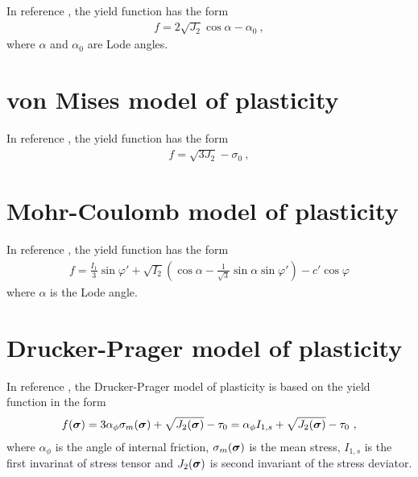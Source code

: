 In reference \cite{prochazka}, the yield function has the form
\begin{eqnarray}
f = 2\sqrt{J_2} \cos \alpha - \alpha_0\ ,
\end{eqnarray}
where $\alpha$ and $\alpha_0$ are Lode angles.

\section{von Mises model of plasticity}

In reference \cite{prochazka}, the yield function has the form
\begin{eqnarray}
f = \sqrt{3 J_2} - \sigma_0\ ,
\end{eqnarray}

\section{Mohr-Coulomb model of plasticity}

In reference \cite{prochazka}, the yield function has the form
\begin{eqnarray}
f = \frac{I_1}{3} \sin \varphi' + \sqrt{I_2}(\cos \alpha - \frac{1}{\sqrt{3}}\sin \alpha \sin \varphi') - c' \cos \varphi 
\end{eqnarray}
where $\alpha$ is the Lode angle.


\section{Drucker-Prager model of plasticity}

In reference \cite{jirasek:skripta}, the Drucker-Prager model of plasticity
is based on the yield function in the form
\begin{eqnarray}
f(\mbox{\boldmath$\sigma$}) = 3 \alpha_{\phi} \sigma_m(\mbox{\boldmath$\sigma$}) + \sqrt{J_2(\mbox{\boldmath$\sigma$})} - \tau_0 = \alpha_{\phi} I_{1,s} + \sqrt{J_2(\mbox{\boldmath$\sigma$})} - \tau_0\ ,
\end{eqnarray}
where $\alpha_{\phi}$ is the angle of internal friction,
$\sigma_m(\mbox{\boldmath$\sigma$})$ is the mean stress,
$I_{1,s}$ is the first invarinat of stress tensor and
$J_2(\mbox{\boldmath$\sigma$})$ is second invariant of the stress deviator.

